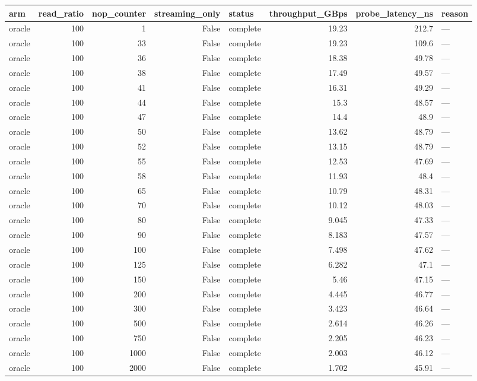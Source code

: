 \begin{tabular}{lrrrlrrl}
\toprule
arm & read\_ratio & nop\_counter & streaming\_only & status & throughput\_GBps & probe\_latency\_ns & reason \\
\midrule
oracle & 100 & 1 & False & complete & 19.23 & 212.7 & — \\
oracle & 100 & 33 & False & complete & 19.23 & 109.6 & — \\
oracle & 100 & 36 & False & complete & 18.38 & 49.78 & — \\
oracle & 100 & 38 & False & complete & 17.49 & 49.57 & — \\
oracle & 100 & 41 & False & complete & 16.31 & 49.29 & — \\
oracle & 100 & 44 & False & complete & 15.3 & 48.57 & — \\
oracle & 100 & 47 & False & complete & 14.4 & 48.9 & — \\
oracle & 100 & 50 & False & complete & 13.62 & 48.79 & — \\
oracle & 100 & 52 & False & complete & 13.15 & 48.79 & — \\
oracle & 100 & 55 & False & complete & 12.53 & 47.69 & — \\
oracle & 100 & 58 & False & complete & 11.93 & 48.4 & — \\
oracle & 100 & 65 & False & complete & 10.79 & 48.31 & — \\
oracle & 100 & 70 & False & complete & 10.12 & 48.03 & — \\
oracle & 100 & 80 & False & complete & 9.045 & 47.33 & — \\
oracle & 100 & 90 & False & complete & 8.183 & 47.57 & — \\
oracle & 100 & 100 & False & complete & 7.498 & 47.62 & — \\
oracle & 100 & 125 & False & complete & 6.282 & 47.1 & — \\
oracle & 100 & 150 & False & complete & 5.46 & 47.15 & — \\
oracle & 100 & 200 & False & complete & 4.445 & 46.77 & — \\
oracle & 100 & 300 & False & complete & 3.423 & 46.64 & — \\
oracle & 100 & 500 & False & complete & 2.614 & 46.26 & — \\
oracle & 100 & 750 & False & complete & 2.205 & 46.23 & — \\
oracle & 100 & 1000 & False & complete & 2.003 & 46.12 & — \\
oracle & 100 & 2000 & False & complete & 1.702 & 45.91 & — \\

\end{tabular}
